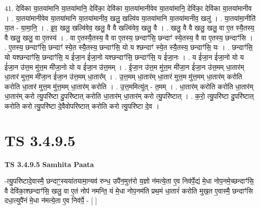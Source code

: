 \documentclass[17pt]{extarticle}
\begin{document}
41. देवि॑का या॒तया॑मानि या॒तया॑मानि॒ देवि॑का॒ देवि॑का या॒तया॑मानीवेव या॒तया॑मानि॒ देवि॑का॒ देवि॑का या॒तया॑मानीव । . या॒तया॑मानीवेव या॒तया॑मानि या॒तया॑मानीव॒ खलु॒ खल्वि॑व या॒तया॑मानि या॒तया॑मानीव॒ खलु॑ । . या॒तया॑मा॒नीति॑ या॒त - या॒मा॒नि॒ । . इ॒व॒ खलु॒ खल्वि॑वेव॒ खलु॒ वै वै खल्वि॑वेव॒ खलु॒ वै । . खलु॒ वै वै खलु॒ खलु॒ वा ए॒त स्यै॒तस्य॒ वै खलु॒ खलु॒ वा ए॒तस्य॑ । . वा ए॒तस्यै॒तस्य॒ वै वा ए॒तस्य॒ छन्दाꣳ॑सि॒ छन्दाꣳ॑ स्ये॒तस्य॒ वै वा ए॒तस्य॒ छन्दाꣳ॑सि । . ए॒तस्य॒ छन्दाꣳ॑सि॒ छन्दाꣳ॑ स्ये॒त स्यै॒तस्य॒ छन्दाꣳ॑सि॒ यो य श्छन्दाꣳ॑ स्ये॒त स्यै॒तस्य॒ छन्दाꣳ॑सि॒ यः । . छन्दाꣳ॑सि॒ यो यश्छन्दाꣳ॑सि॒ छन्दाꣳ॑सि॒ य ई॑जा॒न ई॑जा॒नो यश्छन्दाꣳ॑सि॒ छन्दाꣳ॑सि॒ य ई॑जा॒नः । . य ई॑जा॒न ई॑जा॒नो यो य ई॑जा॒न उ॑त्त॒म मु॑त्त॒म मी॑जा॒नो यो य ई॑जा॒न उ॑त्त॒मम् । . ई॒जा॒न उ॑त्त॒म मु॑त्त॒म मी॑जा॒न ई॑जा॒न उ॑त्त॒मम् धा॒तार॑म् धा॒तार॑ मुत्त॒म मी॑जा॒न ई॑जा॒न उ॑त्त॒मम् धा॒तार᳚म् । . उ॒त्त॒मम् धा॒तार॑म् धा॒तार॑ मुत्त॒म मु॑त्त॒मम् धा॒तार॑म् करोति करोति धा॒तार॑ मुत्त॒म मु॑त्त॒मम् धा॒तार॑म् करोति । . उ॒त्त॒ममित्यु॑त् - त॒मम् । . धा॒तार॑म् करोति करोति धा॒तार॑म् धा॒तार॑म् करो त्यु॒परि॑ष्टा दु॒परि॑ष्टात् करोति धा॒तार॑म् धा॒तार॑म् 
करो त्यु॒परि॑ष्टात् । . क॒रो॒ त्यु॒परि॑ष्टा दु॒परि॑ष्टात् करोति करो त्यु॒परि॑ष्टा दे॒वैवोपरि॑ष्टात् करोति करो त्यु॒परि॑ष्टा दे॒व । \newline
\pagebreak
{}

\section{ TS 3.4.9.5 }

\textbf{TS 3.4.9.5 } \newline
\textbf{Samhita Paata} \newline

-त्यु॒परि॑ष्टादे॒वास्मै॒ छन्दाꣳ॒॒स्यया॑तयामा॒न्यव॑ रुन्ध॒ उपै॑न॒मुत्त॑रो य॒ज्ञो न॑मत्ये॒ता ए॒व निव॑र्पे॒द्यं मे॒धा नोप॒नमे॒च्छन्दाꣳ॑सि॒ वै देवि॑का॒श्छन्दाꣳ॑सि॒ खलु॒ वा ए॒तं नोप॑ नमन्ति॒ यं मे॒धा नोप॒नम॑ति प्रथ॒मं धा॒तारं॑ करोति मुख॒त ए॒वास्मै॒ छन्दाꣳ॑सि दधा॒त्युपै॑नं मे॒धा न॑मत्ये॒ता ए॒व निव॑र्पे॒ - [  ] \newline
\end{document}
